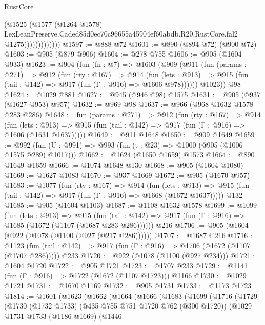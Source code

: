 \begin{lexlean}{RustCore}
\begin{coremodule}
                          (@1525
                            (@1577
                              (@1264 @1578)
                              LexLeanPreserve.Caded85d0ec70c96655a45904ef60abdb.R20.RustCore.fal2
                              @1275)))))))))))))
@1597 := @888 @72
@1601 := @890 (@894 @72) (@900 @72)
@1603 := @905 (@879 @906)
@1604 := @278 @755
@1606 := @905 (@1604 @933)
@1623 := @904
    (fun (fn : @7) =>
    @1603
      (@909
        (@911
          (fun (params : @271) =>
          @912
            (fun (rty : @167) =>
            @914
              (fun (lets : @913) =>
              @915 (fun (tail : @142) => @917 (fun (Γ : @916) => @1606 @978))))))
        @1023))
    @98
@1624 := @1029 @881
@1627 := @945 (@946 @98) @1575
@1631 := @905 (@937 (@1627 @953) @957)
@1632 := @969 @98
@1637 := @966 (@968 @1632 @1578 @283 @286)
@1648 := fun (params : @271) =>
  @912
    (fun (rty : @167) =>
    @914
      (fun (lets : @913) =>
      @915 (fun (tail : @142) => @917 (fun (Γ : @916) => @1606 (@1631 @1637)))))
@1649 := @911 @1648
@1650 := @909 @1649
@1659 := @992 (fun (U : @991) => @993 (fun (t : @23) => @1000 (@905 (@1006 @1575 @289) @1017)))
@1662 := @1624 (@1650 @1659) @1573
@1664 := @890 @1649 @1659
@1666 := @1074 @1648 @130
@1668 := @905 (@1604 @1080)
@1669 := @1627 @1083
@1670 := @937 @1669
@1672 := @905 (@1670 @957)
@1683 := @1077
    (fun (rty : @167) =>
    @914
      (fun (lets : @913) =>
      @915 (fun (tail : @142) => @917 (fun (Γ : @916) => @1668 (@1672 @1637)))))
    @132
@1685 := @905 (@1604 @1103)
@1687 := @1108 @1632 @1578
@1699 := @1099
    (fun (lets : @913) =>
    @915 (fun (tail : @142) => @917 (fun (Γ : @916) => @1685 (@1672 (@1107 (@1687 @283 @286))))))
    @216
@1706 := @905 (@1604 (@922 (@1078 (@1100 (@927 (@217 @286))))))
@1707 := @1687 @216
@1716 := @1123
    (fun (tail : @142) => @917 (fun (Γ : @916) => @1706 (@1672 (@1107 (@1707 @286)))))
    @233
@1720 := @922 (@1078 (@1100 (@927 @234)))
@1721 := @1604 @1720
@1722 := @905 @1721
@1723 := @1707 @233
@1729 := @1141 (fun (Γ : @916) => @1722 (@1672 (@1107 @1723))) @1166
@1730 := @1029 @1721
@1731 := @1670 @1169
@1732 := @905 @1731
@1733 := @1173 @1723
@1814 := @1601
    (@1623
      (@1662
        (@1664
          (@1666
            (@1683
              (@1699
                (@1716
                  (@1729
                    (@1730
                      (@1732 @1733)
                      (@435 @755 @751 @1720 @762 (@300 @1720))
                      (@1029
                        @1731
                        @1733
                        (@1186 @1669)
                        (@1446

\end{coremodule}
\end{lexlean}
